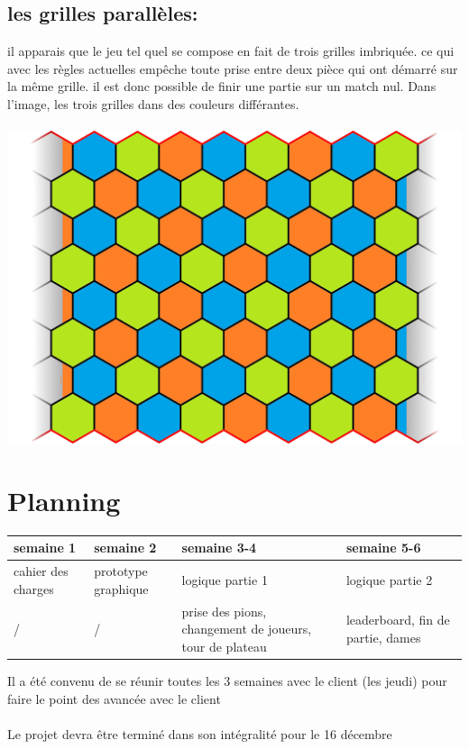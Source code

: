 \documentclass{article}
\begin{document}
\subsection{les grilles parallèles:}
il apparais que le jeu tel quel se compose en fait de trois grilles imbriquée. ce qui avec les règles actuelles empêche toute prise entre deux pièce qui ont démarré sur la même grille. il est donc possible de finir une partie sur un match nul. Dans l'image, les trois grilles dans des couleurs différantes.\\\\
\includegraphics[scale=0.2]{images/board-grids.png}

\section{Planning}
\begin{table}[h]
\begin{tabularx}{\textwidth}{XXXX}
\toprule
\textbf{semaine 1} & \textbf{semaine 2} & \textbf{semaine 3-4} & \textbf{semaine 5-6}\\
\midrule
cahier des charges & prototype graphique & logique partie 1 & logique partie 2 \\ 
\hline
/ & / & prise des pions, changement de joueurs, tour de plateau & leaderboard, fin de partie, dames\\
\bottomrule
\end{tabularx}
\end{table}
Il a été convenu de se réunir toutes les 3 semaines avec le client (les jeudi) pour faire le point des avancée avec le client\\\\
Le projet devra être terminé dans son intégralité pour le 16 décembre
\end{document}
